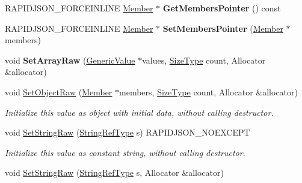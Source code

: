 \begin{DoxyCompactItemize}
R\+A\+P\+I\+D\+J\+S\+O\+N\+\_\+\+F\+O\+R\+C\+E\+I\+N\+L\+I\+NE \hyperlink{class_generic_value_a7ccf27c44058b4c11c3efc6473afb886}{Member} $\ast$ {\bfseries Get\+Members\+Pointer} () const
\item 
\mbox{\label{class_generic_value_a0b488cb0120b154eadde27dc0e694019}} 
R\+A\+P\+I\+D\+J\+S\+O\+N\+\_\+\+F\+O\+R\+C\+E\+I\+N\+L\+I\+NE \hyperlink{class_generic_value_a7ccf27c44058b4c11c3efc6473afb886}{Member} $\ast$ {\bfseries Set\+Members\+Pointer} (\hyperlink{class_generic_value_a7ccf27c44058b4c11c3efc6473afb886}{Member} $\ast$members)
\item 
\mbox{\label{class_generic_value_a8f5f309065479de40a16cf28a340da65}} 
void {\bfseries Set\+Array\+Raw} (\hyperlink{class_generic_value}{Generic\+Value} $\ast$values, \hyperlink{rapidjson_8h_a5ed6e6e67250fadbd041127e6386dcb5}{Size\+Type} count, Allocator \&allocator)
\item 
\mbox{\label{class_generic_value_a26c8ec7d68858df1038506df7fcff22d}} 
void \hyperlink{class_generic_value_a26c8ec7d68858df1038506df7fcff22d}{Set\+Object\+Raw} (\hyperlink{class_generic_value_a7ccf27c44058b4c11c3efc6473afb886}{Member} $\ast$members, \hyperlink{rapidjson_8h_a5ed6e6e67250fadbd041127e6386dcb5}{Size\+Type} count, Allocator \&allocator)
\begin{DoxyCompactList}\small\item\em Initialize this value as object with initial data, without calling destructor. \end{DoxyCompactList}\item 
\mbox{\label{class_generic_value_a1451603922dcdf34976f125dc60f70ee}} 
void \hyperlink{class_generic_value_a1451603922dcdf34976f125dc60f70ee}{Set\+String\+Raw} (\hyperlink{class_generic_value_a32e0f30ee278072374c8168b14d3317f}{String\+Ref\+Type} s) R\+A\+P\+I\+D\+J\+S\+O\+N\+\_\+\+N\+O\+E\+X\+C\+E\+PT
\begin{DoxyCompactList}\small\item\em Initialize this value as constant string, without calling destructor. \end{DoxyCompactList}\item 
\mbox{\label{class_generic_value_ad3d91db36dfdbfc1af40a79aae07723c}} 
void \hyperlink{class_generic_value_ad3d91db36dfdbfc1af40a79aae07723c}{Set\+String\+Raw} (\hyperlink{class_generic_value_a32e0f30ee278072374c8168b14d3317f}{String\+Ref\+Type} s, Allocator \&allocator)

\end{DoxyCompactItemize}
